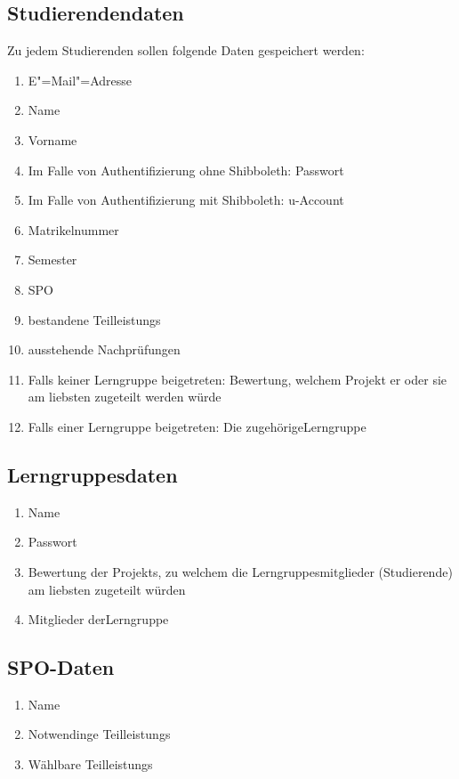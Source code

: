 \documentclass[parskip=full]{scrartcl}
\newcommand{\swtLabel}[1]{\textbf{/#1\arabic*0/}}
\begin{document}
\subsection{Studierendendaten} 
Zu jedem Studierenden sollen folgende Daten gespeichert werden:
\begin{enumerate}[label=\swtLabel{D}, resume] 
  \item E"=Mail"=Adresse \label{SDatenAnfang}
  \item Name
  \item Vorname
  \item Im Falle von Authentifizierung ohne Shibboleth: Passwort
  \item Im Falle von Authentifizierung mit Shibboleth: u-Account
  \item Matrikelnummer
  \item Semester
  \item SPO
  \item bestandene \glspl{Teilleistung} 
  \item ausstehende Nachprüfungen \label{SDatenEnde}
  \item Falls keiner \gls{Lerngruppe} beigetreten: Bewertung, welchem Projekt er oder
  sie am liebsten zugeteilt werden würde
  \item Falls einer \gls{Lerngruppe} beigetreten: Die zugehörige\gls{Lerngruppe}
  
\end{enumerate}
\subsection{\glspl{Lerngruppe}daten} 
\begin{enumerate}[label=\swtLabel{D}, resume] 
  \item Name
  \item Passwort
  \item Bewertung der \glspl{Projekt}, zu welchem die \glspl{Lerngruppe}mitglieder
  (Studierende) am liebsten zugeteilt würden
  \item Mitglieder der\gls{Lerngruppe}
\end{enumerate}

\subsection{SPO-Daten}
\begin{enumerate}[label=\swtLabel{D}, resume]
	\item Name
	\item Notwendinge \glspl{Teilleistung}
	\item Wählbare \glspl{Teilleistung}
\end{enumerate}
\end{document}
